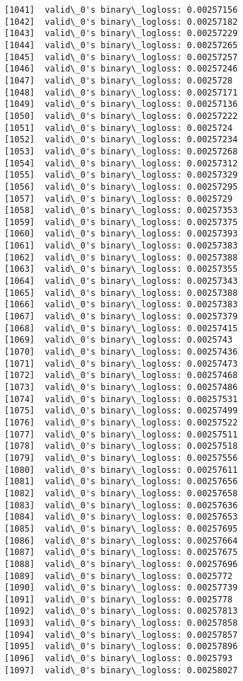 \documentclass[11pt]{article}
\begin{document}
\begin{Verbatim}[commandchars=\\\{\}]
[1041]	valid\_0's binary\_logloss: 0.00257156
[1042]	valid\_0's binary\_logloss: 0.00257182
[1043]	valid\_0's binary\_logloss: 0.00257229
[1044]	valid\_0's binary\_logloss: 0.00257265
[1045]	valid\_0's binary\_logloss: 0.00257257
[1046]	valid\_0's binary\_logloss: 0.00257246
[1047]	valid\_0's binary\_logloss: 0.0025728
[1048]	valid\_0's binary\_logloss: 0.00257171
[1049]	valid\_0's binary\_logloss: 0.00257136
[1050]	valid\_0's binary\_logloss: 0.00257222
[1051]	valid\_0's binary\_logloss: 0.0025724
[1052]	valid\_0's binary\_logloss: 0.00257234
[1053]	valid\_0's binary\_logloss: 0.00257268
[1054]	valid\_0's binary\_logloss: 0.00257312
[1055]	valid\_0's binary\_logloss: 0.00257329
[1056]	valid\_0's binary\_logloss: 0.00257295
[1057]	valid\_0's binary\_logloss: 0.0025729
[1058]	valid\_0's binary\_logloss: 0.00257353
[1059]	valid\_0's binary\_logloss: 0.00257375
[1060]	valid\_0's binary\_logloss: 0.00257393
[1061]	valid\_0's binary\_logloss: 0.00257383
[1062]	valid\_0's binary\_logloss: 0.00257388
[1063]	valid\_0's binary\_logloss: 0.00257355
[1064]	valid\_0's binary\_logloss: 0.00257343
[1065]	valid\_0's binary\_logloss: 0.00257388
[1066]	valid\_0's binary\_logloss: 0.00257383
[1067]	valid\_0's binary\_logloss: 0.00257379
[1068]	valid\_0's binary\_logloss: 0.00257415
[1069]	valid\_0's binary\_logloss: 0.0025743
[1070]	valid\_0's binary\_logloss: 0.00257436
[1071]	valid\_0's binary\_logloss: 0.00257473
[1072]	valid\_0's binary\_logloss: 0.00257468
[1073]	valid\_0's binary\_logloss: 0.00257486
[1074]	valid\_0's binary\_logloss: 0.00257531
[1075]	valid\_0's binary\_logloss: 0.00257499
[1076]	valid\_0's binary\_logloss: 0.00257522
[1077]	valid\_0's binary\_logloss: 0.00257511
[1078]	valid\_0's binary\_logloss: 0.00257518
[1079]	valid\_0's binary\_logloss: 0.00257556
[1080]	valid\_0's binary\_logloss: 0.00257611
[1081]	valid\_0's binary\_logloss: 0.00257656
[1082]	valid\_0's binary\_logloss: 0.00257658
[1083]	valid\_0's binary\_logloss: 0.00257636
[1084]	valid\_0's binary\_logloss: 0.00257653
[1085]	valid\_0's binary\_logloss: 0.00257695
[1086]	valid\_0's binary\_logloss: 0.00257664
[1087]	valid\_0's binary\_logloss: 0.00257675
[1088]	valid\_0's binary\_logloss: 0.00257696
[1089]	valid\_0's binary\_logloss: 0.0025772
[1090]	valid\_0's binary\_logloss: 0.00257739
[1091]	valid\_0's binary\_logloss: 0.0025778
[1092]	valid\_0's binary\_logloss: 0.00257813
[1093]	valid\_0's binary\_logloss: 0.00257858
[1094]	valid\_0's binary\_logloss: 0.00257857
[1095]	valid\_0's binary\_logloss: 0.00257896
[1096]	valid\_0's binary\_logloss: 0.0025793
[1097]	valid\_0's binary\_logloss: 0.00258027

\end{Verbatim}
\end{document}
